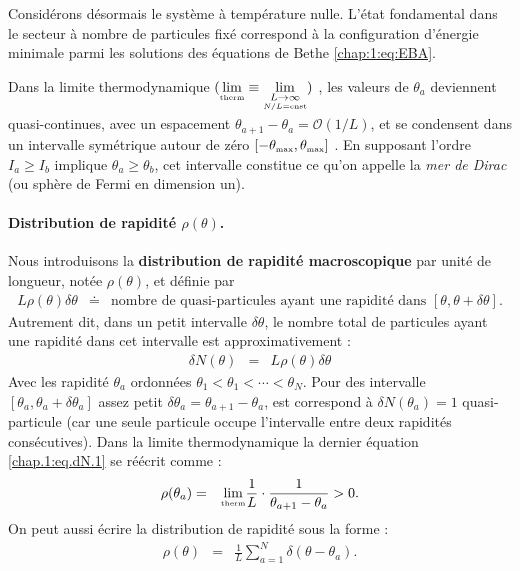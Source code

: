 \medskip

Considérons désormais le système à température nulle. L’état fondamental dans le secteur à nombre de particules fixé correspond à la configuration d’énergie minimale parmi les solutions des équations de Bethe \eqref{chap:1:eq:EBA}.

Dans la limite thermodynamique $(\underset{\text{\tiny therm}}{\lim} \equiv \underset{\underset{ N/L = \mathrm{cnst}}{L \to \infty}}{\lim} )$ , les valeurs de \( \theta_a \) deviennent quasi-continues, avec un espacement \( \theta_{a+1} - \theta_a = \mathcal{O}(1/L) \), et se condensent dans un intervalle symétrique autour de zéro $[-\theta_{\mbox{\tiny max}} , \theta_{\mbox{\tiny max}} ]$ . En supposant l'ordre \( I_a \geq I_b  \) implique \(\theta_a \geq \theta_b \), cet intervalle constitue ce qu'on appelle la {\em mer de Dirac} (ou sphère de Fermi en dimension un).

\medskip

\paragraph{Distribution de rapidité $\rho(\theta)$.}

Nous introduisons la {\bf distribution de rapidité macroscopique} par unité de longueur, notée \( \rho(\theta) \), et définie par
\begin{eqnarray}
	L \rho(\theta) \delta \theta & \doteq & \mbox{nombre de quasi-particules ayant une rapidité dans } [\theta , \theta + \delta \theta].	
\end{eqnarray}
Autrement dit, dans un petit intervalle $\delta \theta $, le nombre total de particules ayant une rapidité dans cet intervalle est approximativement :
\begin{eqnarray}\label{chap.1:eq.dN.1}
	\delta N (\theta ) & = & L \rho (\theta) \delta \theta 	
\end{eqnarray}
Avec les rapidité $\theta_a$ ordonnées \ie $\theta_1 < \theta_1 < \cdots < \theta_N$. Pour des intervalle $[\theta_a , \theta_a + \delta \theta_a]$ assez petit $\delta \theta_a = \theta_{a+1} - \theta_a$, est correspond à $\delta N (\theta_a) = 1 $ quasi-particule (car une seule particule occupe l’intervalle entre deux rapidités consécutives). Dans la limite thermodynamique la dernier équation \eqref{chap.1:eq.dN.1} se réécrit comme :
\begin{eqnarray}
	\rho(\theta_a) & = & \underset{\text{\tiny therm}}{\lim} \frac{1}{L} \cdot \frac{1}{\theta_{a+1} - \theta_a} > 0.
\end{eqnarray}
On peut aussi écrire la distribution de rapidité sous la forme :
\begin{eqnarray}\label{chap.1:eq.rho.111111}
	\rho(\theta) & = & \frac{1}{L} \sum_{a = 1}^N \delta ( \theta - \theta_a ) .	
\end{eqnarray}

